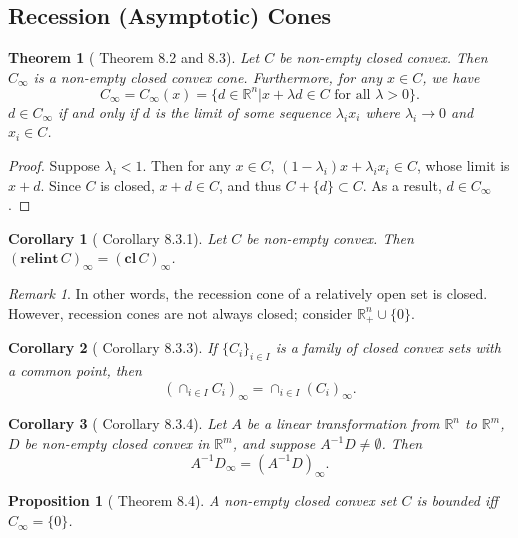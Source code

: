 \documentclass[openany]{book}
\newtheorem{corollary}{Corollary}[chapter]
\newtheorem{proposition}{Proposition}[chapter]
\newtheorem{theorem}{Theorem}[chapter]
\theoremstyle{definition}
\theoremstyle{remark}
\newtheorem*{remark}{Remark}
\begin{document}
\subsection{Recession (Asymptotic) Cones}
\begin{theorem}[\cite{R15} Theorem 8.2 and 8.3]
    Let $C$ be non-empty closed convex. Then $C_{\infty}$ is a non-empty closed convex cone. Furthermore, for any $x\in C$, we have
    \begin{equation*}
        C_{\infty}=C_{\infty}(x)=\{d\in \mathbb{R}^n|x+\lambda d\in C\textrm{ for all }\lambda>0\}.
    \end{equation*}
    $d\in C_{\infty}$ if and only if $d$ is the limit of some sequence $\lambda_ix_i$ where $\lambda_i\to0$ and $x_i\in C$.
\end{theorem}
\begin{proof}
    Suppose $\lambda_i<1$. Then for any $x\in C$, $(1-\lambda_i)x+\lambda_ix_i\in C$, whose limit is $x+d$. Since $C$ is closed, $x+d\in C$, and thus $C+\{d\}\subset C$. As a result, $d\in C_{\infty}$.
\end{proof}
\begin{corollary}[\cite{R15} Corollary 8.3.1]
    Let $C$ be non-empty convex. Then $(\mathbf{relint}\,C)_{\infty}=(\mathbf{cl}\,C)_{\infty}$.
\end{corollary}
\begin{remark}
    In other words, the recession cone of a relatively open set is closed. However, recession cones are not always closed; consider $\mathbb{R}_+^n\cup\{0\}$.
\end{remark}
\begin{corollary}[\cite{R15} Corollary 8.3.3]
    If $\{C_i\}_{i\in I}$ is a family of closed convex sets with a common point, then
    \begin{equation*}
        (\cap_{i\in I}C_i)_{\infty}=\cap_{i\in I}(C_i)_{\infty}.
    \end{equation*}
\end{corollary}
\begin{corollary}[\cite{R15} Corollary 8.3.4]
    Let $A$ be a linear transformation from $\mathbb{R}^n$ to $\mathbb{R}^m$, $D$ be non-empty closed convex in $\mathbb{R}^m$, and suppose $A^{-1}D\ne\emptyset$. Then
    \begin{equation*}
        A^{-1}D_{\infty}=(A^{-1}D)_{\infty}.
    \end{equation*}
\end{corollary}

\begin{proposition}[\cite{R15} Theorem 8.4]
    A non-empty closed convex set $C$ is bounded iff $C_{\infty}=\{0\}$.
\end{proposition}
\end{document}
